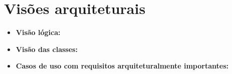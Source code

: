 \documentclass[11pt, a4paper]{article}
\begin{document}
    \section{Visões arquiteturais}
        \begin{itemize}
            \item \textbf{Visão lógica:} %
            
            \item \textbf{Visão das classes:} %
            
            \item \textbf{Casos de uso com requisitos arquiteturalmente
            importantes:} %
        \end{itemize}
\end{document}
